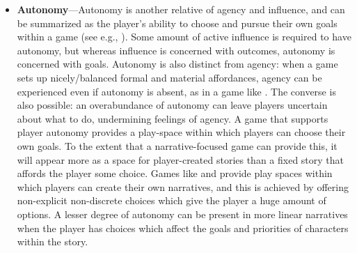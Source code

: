 \begin{itemize}
\item \textbf{Autonomy}---Autonomy is another relative of agency and influence, and can be summarized as the player's ability to choose and pursue their own goals within a game (see e.g., \citep{Ryan2006}).
%
Some amount of active influence is required to have autonomy, but whereas influence is concerned with outcomes, autonomy is concerned with goals.
%
Autonomy is also distinct from agency: when a game sets up nicely\-/balanced formal and material affordances, agency can be experienced even if autonomy is absent, as in a game like .
%
The converse is also possible: an overabundance of autonomy can leave players uncertain about what to do, undermining feelings of agency.
%
A game that supports player autonomy provides a play-space within which players can choose their own goals.
%
To the extent that a narrative-focused game can provide this, it will appear more as a space for player-created stories than a fixed story that affords the player some choice.
%
Games like  \citep{SimCity} and  \citep{TheSims} provide play spaces within which players can create their own narratives, and this is achieved by offering non-explicit non-discrete choices which give the player a huge amount of options.
%
A lesser degree of autonomy can be present in more linear narratives when the player has choices which affect the goals and priorities of characters within the story.



\end{itemize}
